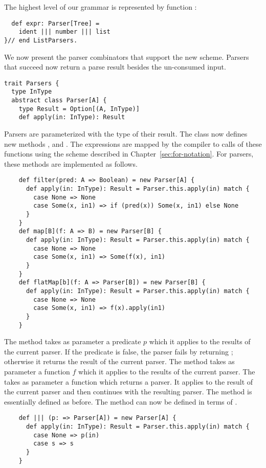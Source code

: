 {{The highest level of our grammar is represented by function
:
\begin{lstlisting}
  def expr: Parser[Tree] = 
    ident ||| number ||| list
}// end ListParsers.
\end{lstlisting}
We now present the parser combinators that support the new
scheme. Parsers that succeed now return a parse result besides the
un-consumed input.
\begin{lstlisting}
trait Parsers {
  type InType
  abstract class Parser[A] {
    type Result = Option[(A, InType)]
    def apply(in: InType): Result
\end{lstlisting}
Parsers are parameterized with the type of their result. The class
 now defines new methods , 
and . The  expressions are mapped by the
compiler to calls of these functions using the scheme described in
Chapter~\ref{sec:for-notation}. For parsers, these methods are
implemented as follows.
\begin{lstlisting}
    def filter(pred: A => Boolean) = new Parser[A] {
      def apply(in: InType): Result = Parser.this.apply(in) match {
        case None => None
        case Some(x, in1) => if (pred(x)) Some(x, in1) else None
      }
    }
    def map[B](f: A => B) = new Parser[B] {
      def apply(in: InType): Result = Parser.this.apply(in) match {
        case None => None
        case Some(x, in1) => Some(f(x), in1)
      }
    }
    def flatMap[b](f: A => Parser[B]) = new Parser[B] {
      def apply(in: InType): Result = Parser.this.apply(in) match {
        case None => None
        case Some(x, in1) => f(x).apply(in1)
      }
    }
\end{lstlisting}
The  method takes as parameter a predicate $p$ which it
applies to the results of the current parser. If the predicate is
false, the parser fails by returning ; otherwise it returns
the result of the current parser.  The  method takes as
parameter a function $f$ which it applies to the results of the
current parser. The  takes as parameter a function
 which returns a parser.  It applies  to the result of
the current parser and then continues with the resulting parser.  The
\code{|||} method is essentially defined as before.  The
\code{&&&} method can now be defined in terms of .
\begin{lstlisting}
    def ||| (p: => Parser[A]) = new Parser[A] {
      def apply(in: InType): Result = Parser.this.apply(in) match {
        case None => p(in)
        case s => s
      }
    }


\end{lstlisting}}}
